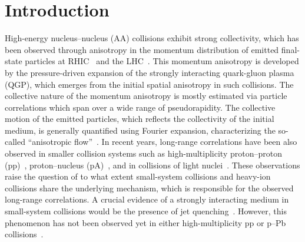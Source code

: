 
\section{Introduction}
\label{sec:intro}

High-energy nucleus--nucleus (AA) collisions exhibit strong collectivity, which has been observed through anisotropy in the momentum distribution of emitted final-state particles at RHIC~\cite{Adams:2005dq,Adcox:2004mh,Arsene:2004fa,Back:2004je} and the LHC~\cite{Abelev:2012di, Abelev:2014pua, ATLAS:2011ah,ALICE:2022wpn}. This momentum anisotropy is developed by the pressure-driven expansion of the strongly interacting quark-gluon plasma (QGP), which emerges from the initial spatial anisotropy in such collisions.
The collective nature of the momentum anisotropy is mostly estimated via particle correlations which span over a wide range of pseudorapidity. The collective motion of the emitted particles, which reflects the collectivity of the initial medium, is generally quantified using Fourier expansion, characterizing the so-called ``anisotropic flow''~\cite{Ollitrault:1992bk}. In recent years, long-range correlations have been also observed in smaller collision systems such as high-multiplicity proton--proton (pp)~\cite{ATLAS:2015hzw,Khachatryan:2015lva,Khachatryan:2016txc,Acharya:2019vdf,ATLAS:2017rtr}, proton--nucleus (pA)~\cite{ALICE:2012eyl,ATLAS:2014qaj,ATLAS:2016yzd,Khachatryan:2016ibd}, and in collisions of light nuclei~\cite{PHENIX:2018lia,Aidala:2017ajz}. 
These observations raise the question of to what extent small-system collisions and heavy-ion collisions share the underlying mechanism, which is responsible for the observed long-range correlations.
A crucial evidence of a strongly interacting medium in small-system collisions would be the presence of jet quenching~\cite{Gyulassy:1990ye,Wang:1991xy}. However, this phenomenon has not been observed yet in either high-multiplicity pp or p--Pb collisions~\cite{Adam:2014qja,Khachatryan:2016odn,Adam:2016jfp,Adam:2016dau,Acharya:2017okq}. %

